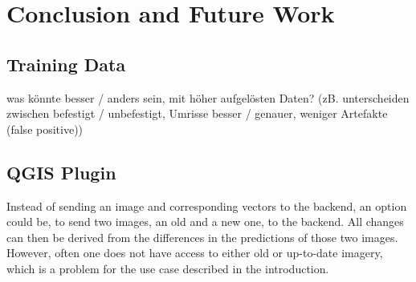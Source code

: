 
\chapter{Conclusion and Future Work}

\section{Training Data}
was könnte besser / anders sein, mit höher aufgelösten Daten? (zB. unterscheiden zwischen befestigt / unbefestigt, Umrisse besser / genauer, weniger Artefakte (false positive))

\section{QGIS Plugin}
Instead of sending an image and corresponding vectors to the backend, an option could be, to send two images, an old and a new one, to the backend. All changes can then be derived
from the differences in the predictions of those two images. However, often one does not have access to either old or up-to-date imagery,
which is a problem for the use case described in the introduction.